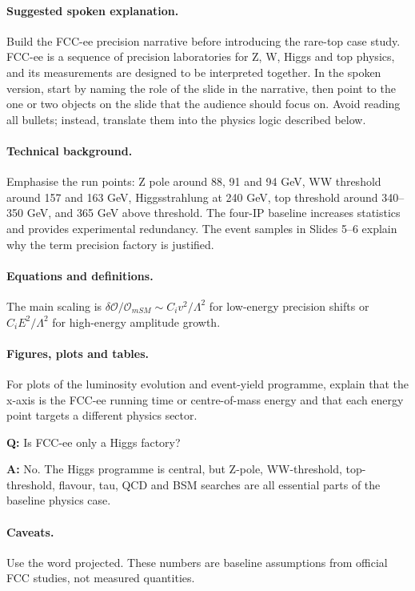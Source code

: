 \documentclass[11pt,a4paper]{report}
\begin{document}
\paragraph{Suggested spoken explanation.}
Build the FCC-ee precision narrative before introducing the rare-top case study. FCC-ee is a sequence of precision laboratories for Z, W, Higgs and top physics, and its measurements are designed to be interpreted together. In the spoken version, start by naming the role of the slide in the narrative, then point to the one or two objects on the slide that the audience should focus on.  Avoid reading all bullets; instead, translate them into the physics logic described below.

\paragraph{Technical background.}
Emphasise the run points: Z pole around 88, 91 and 94 GeV, WW threshold around 157 and 163 GeV, Higgsstrahlung at 240 GeV, top threshold around 340--350 GeV, and 365 GeV above threshold.  The four-IP baseline increases statistics and provides experimental redundancy.  The event samples in Slides 5--6 explain why the term precision factory is justified.

\paragraph{Equations and definitions.}
The main scaling is $\delta\mathcal O/\mathcal O_{
m SM}\sim C_i v^2/\Lambda^2$ for low-energy precision shifts or $C_iE^2/\Lambda^2$ for high-energy amplitude growth.

\paragraph{Figures, plots and tables.}
For plots of the luminosity evolution and event-yield programme, explain that the x-axis is the FCC-ee running time or centre-of-mass energy and that each energy point targets a different physics sector.

\begin{questionbox}
\textbf{Q:} Is FCC-ee only a Higgs factory?\par
\textbf{A:} No.  The Higgs programme is central, but Z-pole, WW-threshold, top-threshold, flavour, tau, QCD and BSM searches are all essential parts of the baseline physics case.
\end{questionbox}

\paragraph{Caveats.}
Use the word projected.  These numbers are baseline assumptions from official FCC studies, not measured quantities.
\end{document}
